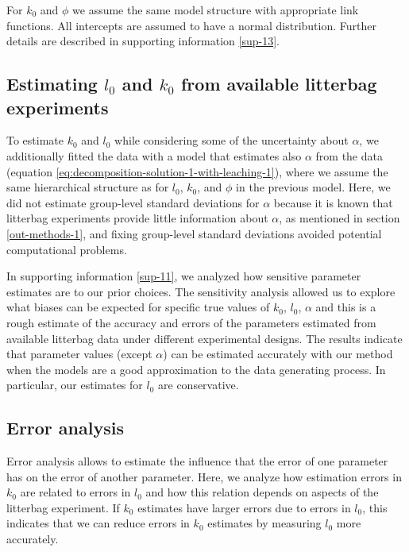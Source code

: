 \documentclass[
  12pt,
]{article}
\begin{document}
For \(k_0\) and \(\phi\) we assume the same model structure with appropriate link functions. All intercepts are assumed to have a normal distribution. Further details are described in supporting information \ref{sup-13}.

\hypertarget{methods-estimate-real-1}{%
\subsection{\texorpdfstring{Estimating \(l_0\) and \(k_0\) from available litterbag experiments}{Estimating l\_0 and k\_0 from available litterbag experiments}}\label{methods-estimate-real-1}}

To estimate \(k_0\) and \(l_0\) while considering some of the uncertainty about \(\alpha\), we additionally fitted the data with a model that estimates also \(\alpha\) from the data (equation \eqref{eq:decomposition-solution-1-with-leaching-1}), where we assume the same hierarchical structure as for \(l_0\), \(k_0\), and \(\phi\) in the previous model. Here, we did not estimate group-level standard deviations for \(\alpha\) because it is known that litterbag experiments provide little information about \(\alpha\), as mentioned in section \ref{out-methods-1}, and fixing group-level standard deviations avoided potential computational problems.

In supporting information \ref{sup-11}, we analyzed how sensitive parameter estimates are to our prior choices. The sensitivity analysis allowed us to explore what biases can be expected for specific true values of \(k_0\), \(l_0\), \(\alpha\) and this is a rough estimate of the accuracy and errors of the parameters estimated from available litterbag data under different experimental designs. The results indicate that parameter values (except \(\alpha\)) can be estimated accurately with our method when the models are a good approximation to the data generating process. In particular, our estimates for \(l_0\) are conservative.

\hypertarget{error-analysis}{%
\subsection{Error analysis}\label{error-analysis}}

Error analysis allows to estimate the influence that the error of one parameter has on the error of another parameter. Here, we analyze how estimation errors in \(k_0\) are related to errors in \(l_0\) and how this relation depends on aspects of the litterbag experiment. If \(k_0\) estimates have larger errors due to errors in \(l_0\), this indicates that we can reduce errors in \(k_0\) estimates by measuring \(l_0\) more accurately.
\end{document}
